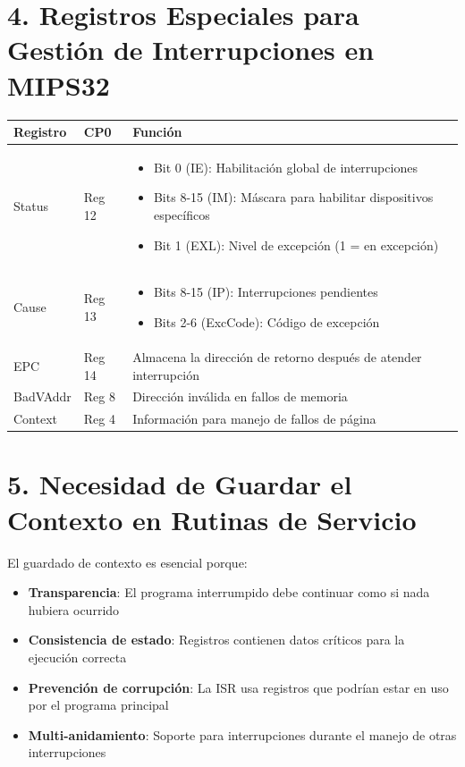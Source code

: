 \documentclass[12pt]{article}
\begin{document}
\section*{4. Registros Especiales para Gestión de Interrupciones en MIPS32}
\begin{table}[h]
\centering
\begin{tabular}{|l|l|p{8cm}|}
\hline
\textbf{Registro} & \textbf{CP0} & \textbf{Función} \\
\hline
Status & Reg 12 & 
\begin{itemize}[leftmargin=*]
    \item Bit 0 (IE): Habilitación global de interrupciones
    \item Bits 8-15 (IM): Máscara para habilitar dispositivos específicos
    \item Bit 1 (EXL): Nivel de excepción (1 = en excepción)
\end{itemize} \\
\hline
Cause & Reg 13 & 
\begin{itemize}[leftmargin=*]
    \item Bits 8-15 (IP): Interrupciones pendientes
    \item Bits 2-6 (ExcCode): Código de excepción
\end{itemize} \\
\hline
EPC & Reg 14 & Almacena la dirección de retorno después de atender interrupción \\
\hline
BadVAddr & Reg 8 & Dirección inválida en fallos de memoria \\
\hline
Context & Reg 4 & Información para manejo de fallos de página \\
\hline
\end{tabular}
\end{table}

\section*{5. Necesidad de Guardar el Contexto en Rutinas de Servicio}
El guardado de contexto es esencial porque:
\begin{itemize}
    \item \textbf{Transparencia}: El programa interrumpido debe continuar como si nada hubiera ocurrido
    \item \textbf{Consistencia de estado}: Registros contienen datos críticos para la ejecución correcta
    \item \textbf{Prevención de corrupción}: La ISR usa registros que podrían estar en uso por el programa principal
    \item \textbf{Multi-anidamiento}: Soporte para interrupciones durante el manejo de otras interrupciones
\end{itemize}
\end{document}
